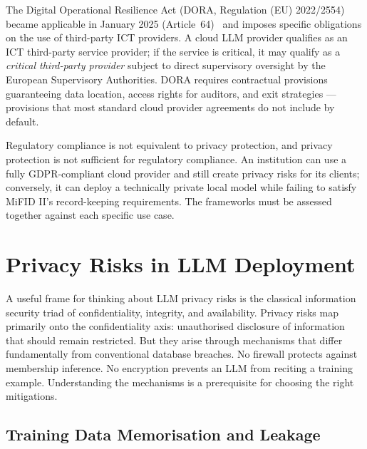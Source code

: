 The Digital Operational Resilience Act (DORA, Regulation (EU) 2022/2554) became applicable in January 2025 (Article~64)~\citep{dora2022} and imposes specific obligations on the use of third-party ICT providers. A cloud LLM provider qualifies as an ICT third-party service provider; if the service is critical, it may qualify as a \emph{critical third-party provider} subject to direct supervisory oversight by the European Supervisory Authorities. DORA requires contractual provisions guaranteeing data location, access rights for auditors, and exit strategies — provisions that most standard cloud provider agreements do not include by default.

\begin{remark}
Regulatory compliance is not equivalent to privacy protection, and privacy protection is not sufficient for regulatory compliance. An institution can use a fully GDPR-compliant cloud provider and still create privacy risks for its clients; conversely, it can deploy a technically private local model while failing to satisfy MiFID II's record-keeping requirements. The frameworks must be assessed together against each specific use case.
\end{remark}

\section{Privacy Risks in LLM Deployment}
\label{sec:ch15-risks}

\begin{context}
A useful frame for thinking about LLM privacy risks is the classical information security triad of confidentiality, integrity, and availability. Privacy risks map primarily onto the confidentiality axis: unauthorised disclosure of information that should remain restricted. But they arise through mechanisms that differ fundamentally from conventional database breaches. No firewall protects against membership inference. No encryption prevents an LLM from reciting a training example. Understanding the mechanisms is a prerequisite for choosing the right mitigations.
\end{context}

\subsection{Training Data Memorisation and Leakage}
\label{sec:ch15-memorisation}

